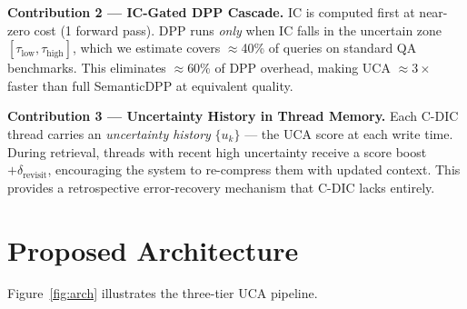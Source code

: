 \documentclass[11pt, a4paper]{article}
\begin{document}
\begin{noveltybox}
\textbf{Contribution 2 --- IC-Gated DPP Cascade.}
IC is computed first at near-zero cost (1 forward pass). DPP runs \textit{only} when IC falls in the uncertain zone $[\tau_{\text{low}}, \tau_{\text{high}}]$, which we estimate covers $\approx$40\% of queries on standard QA benchmarks. This eliminates $\approx$60\% of DPP overhead, making UCA $\approx3\times$ faster than full SemanticDPP at equivalent quality.
\end{noveltybox}

\begin{noveltybox}
\textbf{Contribution 3 --- Uncertainty History in Thread Memory.}
Each C-DIC thread carries an \emph{uncertainty history} $\{u_k\}$ --- the UCA score at each write time. During retrieval, threads with recent high uncertainty receive a score boost $+\delta_{\text{revisit}}$, encouraging the system to re-compress them with updated context. This provides a retrospective error-recovery mechanism that C-DIC lacks entirely.
\end{noveltybox}

\section{Proposed Architecture}
\label{sec:arch}

Figure~\ref{fig:arch} illustrates the three-tier UCA pipeline.
\end{document}
